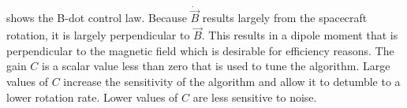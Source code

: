  shows the B-dot control law. Because $\dot{\vec{B}}$ results largely from the spacecraft rotation, it is largely perpendicular to $\vec{B}$. This results in a dipole moment that is perpendicular to the magnetic field which is desirable for efficiency reasons. The gain $C$ is a scalar value less than zero that is used to tune the algorithm. Large values of $C$ increase the sensitivity of the algorithm and allow it to detumble to a lower rotation rate. Lower values of $C$ are less sensitive to noise.


\begin{comment}
\subsection{Detumble}

The goal of the detumble mode is to reduce the rotation rates down to an acceptable level \todo{possibly call out such a level}.



\subsection{Alignment}

Once detumble is complete the alignment procedure begins. The alignment procedure takes a fixed 12 \todo{Double check this number} orbits to complete.

\subsubsection{Attitude Determination}

The original design did not use attitude determination to get the satellite into the proper orientation. Instead the rotation rates are used along with the bias windows to get the satellite into the right alignment. The problem is that computing the rotation to the needed accuracy is not a simple process. The original idea was that the rotation rates could be computed directly from magnetic field measurements. A set of magnetometer measurements would be taken each time step to compute the rotation rates. The problem is that to do the rotation rate calculation a derivative is needed. Numerical differentiation is possible but it tends to increase noise by acting as a high pass filter.


\end{comment}
